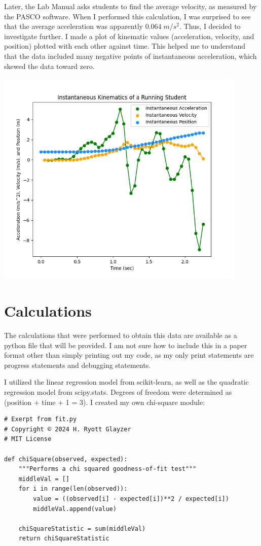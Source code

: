 \documentclass[hidelinks, 12pt, letterpaper]{article}
\begin{document}
Later, the Lab Manual asks students to find the average velocity,
as measured by the PASCO software.
When I performed this calculation,
I was surprised to see that the average acceleration was
apparently $0.064 \; m/s^2$.
Thus, I decided to investigate further.
I made a plot of kinematic values (acceleration, velocity, and position)
plotted with each other against time.
This helped me to understand that the data included many negative 
points of instantaneous acceleration, 
which skewed the data toward zero.

\includegraphics[width=0.9\textwidth]{running-comparison.png}

\section{Calculations}

The calculations that were performed to obtain this data are available
as a python file that will be provided.
I am not sure how to include this in a paper format other than 
simply printing out my code, as my only print statements are 
progress statements and debugging statements.

I utilized the linear regression model from scikit-learn, as well as
the quadratic regression model from scipy.stats. Degrees of freedom were
determined as (position + time + 1 = 3).
I created my own chi-square module:

\begin{verbatim}
# Exerpt from fit.py
# Copyright © 2024 H. Ryott Glayzer
# MIT License

def chiSquare(observed, expected):
    """Performs a chi squared goodness-of-fit test"""
    middleVal = []
    for i in range(len(observed)):
        value = ((observed[i] - expected[i])**2 / expected[i])
        middleVal.append(value)

    chiSquareStatistic = sum(middleVal)
    return chiSquareStatistic
\end{verbatim}
\end{document}
